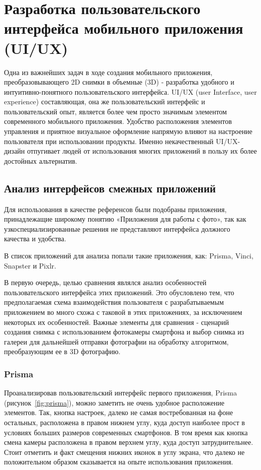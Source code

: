 
\section{Разработка пользовательского интерфейса мобильного приложения (UI/UX)}

Одна из важнейших задач в ходе создания мобильного приложения, преобразовывающего 2D снимки в объемные (3D) - разработка удобного и интуитивно-понятного пользовательского интерфейса. UI/UX (user Interface, user experience) составляющая, она же пользовательский интерфейс и пользовательский опыт, является более чем просто значимым элементом современного мобильного приложения. Удобство расположения элементов управления и приятное визуальное оформление напрямую влияют на настроение пользователя при использовании продукты. Именно некачественный UI/UX-дизайн отпугивает людей от использования многих приложений в пользу их более достойных альтернатив.

\subsection{Анализ интерфейсов смежных приложений}

Для использования в качестве референсов были подобраны приложения, принадлежащие широкому понятию «Приложения для работы с фото», так как узкоспециализированные решения не представляют интерфейса должного качества и удобства.

В список приложений для анализа попали такие приложения, как:  Prisma, Vinci, Snapster и Pixlr.

В первую очередь, целью сравнения являлся анализ особенностей пользовательского интерфейса этих приложений. Это обусловлено тем, что предполагаемая схема  взаимодействия пользователя с разрабатываемым приложением во много схожа с таковой в этих приложениях, за исключением некоторых их особенностей. Важные элементы для сравнения  - сценарий создания снимка с использованием фотокамеры смартфона и выбор снимка из галереи для дальнейшей отправки фотографии на обработку алгоритмом, преобразующим ее в 3D фотографию.

\subsubsection{Prisma}

Проанализировав пользовательский интерфейс первого приложения, Prisma (рисунок~\ref{fig:prisma}), можно заметить не очень удобное расположение элементов. Так, кнопка настроек, далеко не самая востребованная на фоне остальных, расположена в правом нижнем углу, куда доступ наиболее прост в условиях больших размеров современных смартфонов. В том время как кнопка смена камеры расположена в правом верхнем углу, куда доступ затруднительнее. Стоит отметить и факт смещения нижних иконок в углу экрана, что далеко не положительном образом сказывается на опыте использования приложения.

